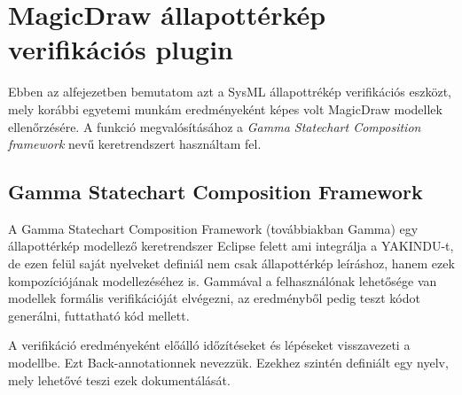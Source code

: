 \section{MagicDraw állapottérkép verifikációs plugin}

Ebben az alfejezetben bemutatom azt a SysML állapottrékép verifikációs eszközt, mely korábbi egyetemi munkám eredményeként képes volt MagicDraw modellek ellenőrzésére. A funkció megvalósításához a \emph{Gamma Statechart Composition framework} nevű keretrendszert használtam fel.

\subsection{Gamma Statechart Composition Framework \cite{DBLP:conf/icse/MolnarGVMV18}}

A Gamma Statechart Composition Framework (továbbiakban Gamma) egy állapottérkép modellező keretrendszer Eclipse felett ami integrálja a YAKINDU-t, de ezen felül saját nyelveket definiál nem csak állapottérkép leíráshoz, hanem ezek kompozíciójának modellezéséhez is. Gammával a felhasználónak lehetősége van modellek formális verifikációját elvégezni, az eredményből pedig teszt kódot generálni, futtatható kód mellett.

A verifikáció eredményeként előálló időzítéseket és lépéseket visszavezeti a modellbe. Ezt Back-annotationnek nevezzük. Ezekhez szintén definiált egy nyelv, mely lehetővé teszi ezek dokumentálását.

